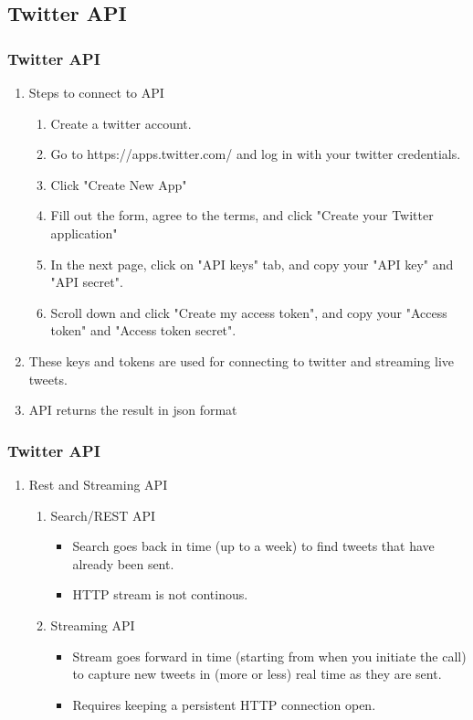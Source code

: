 \documentclass{beamer}
\begin{document}
\subsection{Twitter API}
\begin{frame}
\frametitle{Twitter API}
\begin{enumerate}
\item Steps to connect to API
\begin{enumerate}[I]
\item Create a twitter account.
\item Go to https://apps.twitter.com/ and log in with your twitter credentials.
\item Click "Create New App"
\item Fill out the form, agree to the terms, and click "Create your Twitter application"
\item In the next page, click on "API keys" tab, and copy your "API key" and "API secret".
\item Scroll down and click "Create my access token", and copy your "Access token" and "Access token secret".
\end{enumerate}
\item These keys and tokens are used for connecting to twitter and streaming live tweets.
\item API returns the result in json format
\end{enumerate}
\end{frame}

\begin{frame}
\frametitle{Twitter API}
\begin{enumerate}
\item Rest and Streaming API 
\begin{enumerate}       
\item Search/REST API
\begin{itemize}
\item Search goes back in time (up to a week) to find tweets that have already been sent.
\item  HTTP stream is not continous.
\end{itemize}

\item Streaming API
\begin{itemize}
\item Stream goes forward in time (starting from when you initiate the call) to capture new tweets in (more or less) real time as they are sent.        
\item Requires keeping a persistent HTTP connection open. 
\end{itemize}
\end{enumerate}
\end{enumerate}
\end{frame}
\end{document}
